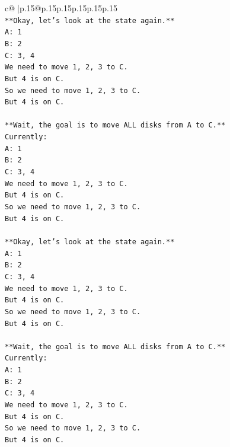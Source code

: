 \documentclass{article}
\begin{document}
{\begin{supertabular}{c@{$\;$}|p{.15\linewidth}@{}p{.15\linewidth}p{.15\linewidth}p{.15\linewidth}p{.15\linewidth}p{.15\linewidth}}
{{{\\ 
\texttt{**Okay, let's look at the state again.**} \\
\texttt{A: 1} \\
\texttt{B: 2} \\
\texttt{C: 3, 4} \\
\texttt{We need to move 1, 2, 3 to C.} \\
\texttt{But 4 is on C.} \\
\texttt{So we need to move 1, 2, 3 to C.} \\
\texttt{But 4 is on C.} \\
\\ 
\texttt{**Wait, the goal is to move ALL disks from A to C.**} \\
\texttt{Currently:} \\
\texttt{A: 1} \\
\texttt{B: 2} \\
\texttt{C: 3, 4} \\
\texttt{We need to move 1, 2, 3 to C.} \\
\texttt{But 4 is on C.} \\
\texttt{So we need to move 1, 2, 3 to C.} \\
\texttt{But 4 is on C.} \\
\\ 
\texttt{**Okay, let's look at the state again.**} \\
\texttt{A: 1} \\
\texttt{B: 2} \\
\texttt{C: 3, 4} \\
\texttt{We need to move 1, 2, 3 to C.} \\
\texttt{But 4 is on C.} \\
\texttt{So we need to move 1, 2, 3 to C.} \\
\texttt{But 4 is on C.} \\
\\ 
\texttt{**Wait, the goal is to move ALL disks from A to C.**} \\
\texttt{Currently:} \\
\texttt{A: 1} \\
\texttt{B: 2} \\
\texttt{C: 3, 4} \\
\texttt{We need to move 1, 2, 3 to C.} \\
\texttt{But 4 is on C.} \\
\texttt{So we need to move 1, 2, 3 to C.} \\
\texttt{But 4 is on C.} \\
\\ 
}}}
\end{supertabular}}
\end{document}
